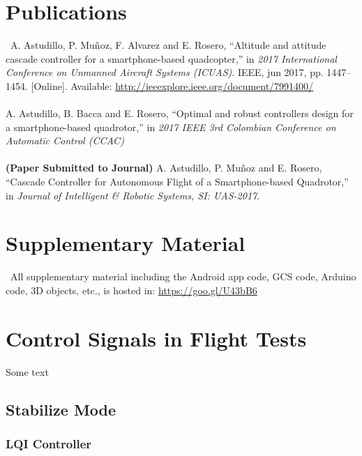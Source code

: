 \begin{appendices}
\chapter{Publications} \label{publications}
\
A. Astudillo, P. Muñoz, F. Alvarez and E. Rosero, “Altitude and attitude cascade controller for a smartphone-based quadcopter,” in \textit{2017 International Conference on Unmanned Aircraft Systems (ICUAS)}. IEEE, jun 2017, pp. 1447–1454. [Online]. Available: \url{http://ieeexplore.ieee.org/document/7991400/}
\\\\
A. Astudillo, B. Bacca and E. Rosero, “Optimal and robust controllers design for a smartphone-based quadrotor,” in \textit{2017 IEEE 3rd Colombian Conference on Automatic Control (CCAC)}
\\\\
\textbf{(Paper Submitted to Journal)} A. Astudillo, P. Muñoz and E. Rosero, “Cascade Controller for Autonomous Flight of a Smartphone-based Quadrotor,” in \textit{Journal of Intelligent \& Robotic Systems, SI: UAS-2017}.

\chapter{Supplementary Material} \label{supplementary}
\
All supplementary material including the Android app code, GCS code, Arduino code, 3D objects, etc., is hosted in:
\url{https://goo.gl/U43bB6}


\chapter{Control Signals in Flight Tests}\label{controlsignals}
Some text
\section*{Stabilize Mode}

\subsection*{LQI Controller}


\end{appendices}
